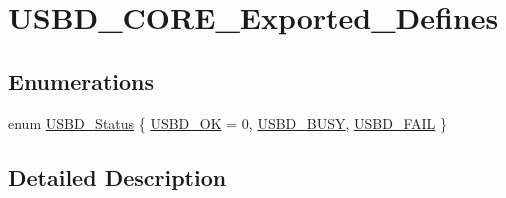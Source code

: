 \hypertarget{group___u_s_b_d___c_o_r_e___exported___defines}{\section{U\-S\-B\-D\-\_\-\-C\-O\-R\-E\-\_\-\-Exported\-\_\-\-Defines}
\label{group___u_s_b_d___c_o_r_e___exported___defines}
}
\subsection*{Enumerations}
\begin{DoxyCompactItemize}
\item 
enum \hyperlink{group___u_s_b_d___c_o_r_e___exported___defines_ga1c59ec10075b576176aa51c9ef4e9fc4}{U\-S\-B\-D\-\_\-\-Status} \{ \hyperlink{group___u_s_b_d___c_o_r_e___exported___defines_gga1c59ec10075b576176aa51c9ef4e9fc4a82f83a0537693d71dd31a4ae9960d737}{U\-S\-B\-D\-\_\-\-O\-K} = 0, 
\hyperlink{group___u_s_b_d___c_o_r_e___exported___defines_gga1c59ec10075b576176aa51c9ef4e9fc4ac740a5fc3a2c8458f50c1778a85b68b4}{U\-S\-B\-D\-\_\-\-B\-U\-S\-Y}, 
\hyperlink{group___u_s_b_d___c_o_r_e___exported___defines_gga1c59ec10075b576176aa51c9ef4e9fc4a05db9cbdbff7d5bb866a9d9f3dcdbe8e}{U\-S\-B\-D\-\_\-\-F\-A\-I\-L}
 \}
\end{DoxyCompactItemize}


\subsection{Detailed Description}


